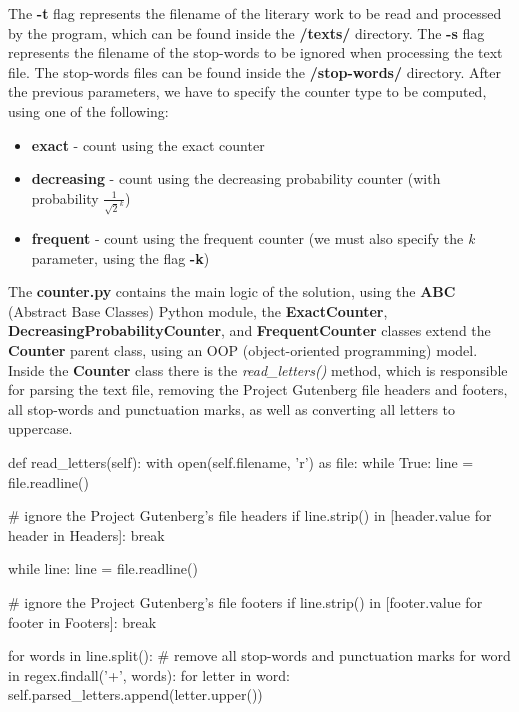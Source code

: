 \documentclass[...]{revdetua}
\begin{document}
The \textbf{-t} flag represents the filename of the literary work to be read and processed by the program, which can be found inside the \textbf{/texts/} directory. The \textbf{-s} flag represents the filename of the stop-words to be ignored when processing the text file. The stop-words files can be found inside the \textbf{/stop-words/} directory. After the previous parameters, we have to specify the counter type to be computed, using one of the following:
\begin{itemize}
    \item \textbf{exact} - count using the exact counter
    \item \textbf{decreasing} - count using the decreasing probability counter (with probability \(\frac{1}{\sqrt{2}^k}\))
    \item \textbf{frequent} - count using the frequent counter (we must also specify the \textit{k} parameter, using the flag \textbf{-k})
\end{itemize}

The \textbf{counter.py} contains the main logic of the solution, using the \textbf{ABC}\cite{abstract_base_classes} (Abstract Base Classes) Python module, the \textbf{ExactCounter}, \textbf{DecreasingProbabilityCounter}, and \textbf{FrequentCounter} classes extend the \textbf{Counter} parent class, using an OOP (object-oriented programming) model.
Inside the \textbf{Counter} class there is the \textit{read\_letters()} method, which is responsible for parsing the text file, removing the Project Gutenberg file headers and footers, all stop-words and punctuation marks, as well as converting all letters to uppercase.

\begin{python}[linenos, tabsize=1, breaklines]
def read_letters(self):
    with open(self.filename, 'r') as file:
        while True:
            line = file.readline()

            # ignore the Project Gutenberg's file headers
                if line.strip() in [header.value for header in Headers]: break
                
        while line:
            line = file.readline()

            # ignore the Project Gutenberg's file footers
            if line.strip() in [footer.value for footer in Footers]: break
            
            for words in line.split():
                # remove all stop-words and punctuation marks
                for word in regex.findall('+', words):
                    for letter in word:
                        self.parsed_letters.append(letter.upper())
\end{python}
\end{document}

